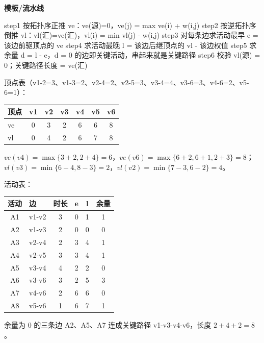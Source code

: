 \documentclass[10pt,a4paper]{ctexart}
\begin{document}

\textbf{模板/流水线}

\begin{codebox}
step1  按拓扑序正推 ve：ve(源)=0，ve(j) = max{ ve(i) + w(i,j) }
step2  按逆拓扑序倒推 vl：vl(汇)=ve(汇)，vl(i) = min{ vl(j) - w(i,j) }
step3  对每条边求活动最早 e = 该边前驱顶点的 ve
step4  求活动最晚 l = 该边后继顶点的 vl - 该边权值
step5  求余量 d = l - e，d = 0 的边即关键活动，串起来就是关键路径
step6  校验 vl(源) = 0；关键路径长度 = ve(汇)
\end{codebox}

顶点表（v1-2=3、v1-3=2、v2-4=2、v2-5=3、v3-4=4、v3-6=3、v4-6=2、v5-6=1）：

\begin{center}\small
\begin{tabularx}{\linewidth}{@{}>{\raggedright\arraybackslash}Xcccccc@{}}
\toprule
顶点 & v1 & v2 & v3 & v4 & v5 & v6 \\
\midrule
ve & 0 & 3 & 2 & 6 & 6 & 8 \\
vl & 0 & 4 & 2 & 6 & 7 & 8 \\
\bottomrule
\end{tabularx}
\end{center}

$ve(v4)=\max\{3+2,2+4\}=6$，$ve(v6)=\max\{6+2,6+1,2+3\}=8$；$vl(v3)=\min\{6-4,8-3\}=2$，$vl(v2)=\min\{7-3,6-2\}=4$。

活动表：

\begin{center}\small
\begin{tabularx}{\linewidth}{@{}c>{\raggedright\arraybackslash}Xcccc@{}}
\toprule
活动 & 边 & 时长 & e & l & 余量 \\
\midrule
A1 & v1-v2 & 3 & 0 & 1 & 1 \\
A2 & v1-v3 & 2 & 0 & 0 & 0 \\
A3 & v2-v4 & 2 & 3 & 4 & 1 \\
A4 & v2-v5 & 3 & 3 & 4 & 1 \\
A5 & v3-v4 & 4 & 2 & 2 & 0 \\
A6 & v3-v6 & 3 & 2 & 5 & 3 \\
A7 & v4-v6 & 2 & 6 & 6 & 0 \\
A8 & v5-v6 & 1 & 6 & 7 & 1 \\
\bottomrule
\end{tabularx}
\end{center}

余量为 0 的三条边 A2、A5、A7 连成关键路径 v1-v3-v4-v6，长度 $2+4+2=8$。
\end{document}
